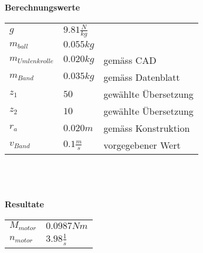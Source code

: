 \textbf{Berechnungswerte}\\
\begin{tabular}{lll}
	\rule{0pt}{11pt} $g$ & $9.81 \frac{N}{kg}$ & \\
	\rule{0pt}{11pt} $m_{ball}$ & $0.055 kg$ & \\
	\rule{0pt}{11pt} $m_{Umlenkrolle}$ & $0.020 kg$ & gemäss CAD \\
	\rule{0pt}{11pt} $m_{Band}$ & $0.035 kg$ & gemäss Datenblatt \\
	\rule{0pt}{11pt} $z_1$ & $50$ & gewählte Übersetzung \\
	\rule{0pt}{11pt} $z_2$ & $10$ & gewählte Übersetzung \\
	\rule{0pt}{11pt} $r_a$ & $0.020 m$ & gemäss Konstruktion \\
	\rule{0pt}{11pt} $v_{Band}$ & $0.1 \frac{m}{s}$ & vorgegebener Wert \\
\end{tabular}\\
\\
\\
\textbf{Resultate}\\
\begin{tabular}{ll}
	\rule{0pt}{11pt} $M_{motor}$ & $0.0987 Nm$ \\
	\rule{0pt}{11pt} $n_{motor}$ & $3.98 \frac{1}{s}$ \\
\end{tabular}